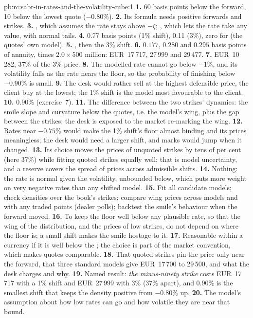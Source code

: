\begin{solution}{pb:rc:sabr-in-rates-and-the-volatility-cube:1}
\textbf{1.} 60 basis points below the forward, 10 below the lowest quote
($-0.80\%$).
\textbf{2.} Its formula needs positive forwards and strikes.
\textbf{3.} , which assumes the rate stays above $-\zeta$; ,
which lets the rate take any value, with normal tails.
\textbf{4.} 0.77 basis points (1\% shift), 0.11 (3\%), zero for  (the
quotes' own model).
\textbf{5.} , then the 3\% shift.
\textbf{6.} $0.177$, $0.280$ and $0.295$ basis points of annuity, times $2.0\times
500$ million: EUR~17\,717, 27\,999 and 29\,477.
\textbf{7.} EUR~10\,282, 37\% of the 3\% price.
\textbf{8.} The modelled rate cannot go below $-1\%$, and its volatility falls as the
rate nears the floor, so the probability of finishing below $-0.90\%$ is small.
\textbf{9.} The desk would rather sell at the highest defensible price, the client
buy at the lowest; the 1\% shift is the model most favourable to the client.
\textbf{10.} 0.90\% (exercise~7).
\textbf{11.} The difference between the two strikes' dynamics: the smile slope and
curvature below the quotes, i.e. the model's wing, plus the gap between the
strikes; the desk is exposed to the market re-marking the wing.
\textbf{12.} Rates near $-0.75\%$ would make the 1\% shift's floor almost binding and
its prices meaningless; the desk would need a larger shift, and marks would
jump when it changed.
\textbf{13.} Its choice moves the prices of unquoted strikes by tens of per cent
(here 37\%) while fitting quoted strikes equally well; that is model
uncertainty, and a reserve covers the spread of prices across admissible shifts.
\textbf{14.} Nothing: the rate is normal given the volatility, unbounded below,
which puts more weight on very negative rates than any shifted model.
\textbf{15.} Fit all candidate models; check densities over the book's strikes;
compare wing prices across models and with any traded points (dealer polls);
backtest the smile's behaviour when the forward moved.
\textbf{16.} To keep the floor well below any plausible rate, so that the wing of
the distribution, and the prices of low strikes, do not depend on where the
floor is; a small shift makes the smile hostage to it.
\textbf{17.} Reasonable within a currency if it is well below the ; the choice is part of the market convention, which makes quotes
comparable.
\textbf{18.} That quoted strikes pin the price only near the forward, that three
standard models give EUR~17\,700 to 29\,500, and what the desk charges and why.
\textbf{19.} Named result: \emph{the minus-ninety strike} costs EUR~17\,717 with a 1\%
shift and EUR~27\,999 with 3\% (37\% apart), and 0.90\% is the smallest shift
that keeps the density positive from $-0.80\%$ up.
\textbf{20.} The model's assumption about how low rates can go and how volatile
they are near that bound.
\end{solution}

